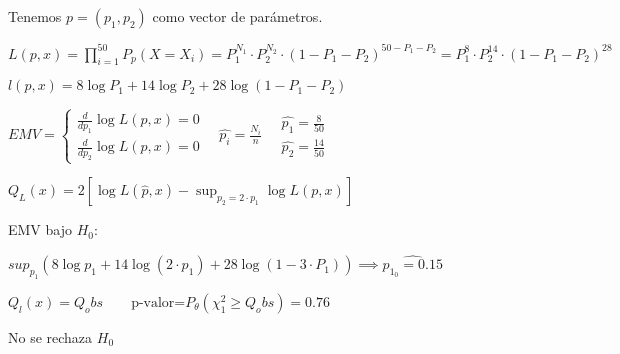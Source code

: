 Tenemos $p=(p_1,p_2)$ como vector de parámetros.

\(
L(p,x)=\prod_{i=1}^{50} P_p(X=X_i)=P_1^{N_1}\cdot P_2^{N_2}\cdot (1-P_1-P_2)^{50-P_1-P_2}=P_1^8\cdot P_2^{14} \cdot (1-P_1-P_2)^{28}
\)

\(
l(p,x)=8 \log P_1 +14 \log P_2 +28 \log (1-P_1-P_2)
\)

\(
EMV=\left\{
\begin{array}{l}
    \frac{d}{d p_1} \log L(p,x)=0\\
    \frac{d}{d p_2} \log L(p,x)=0
\end{array}
\right.
\quad \hat{p_i}=\frac{N_i}{n}
\quad
\begin{matrix}
    \hat{p_1}=\frac{8}{50}\\
    \hat{p_2}=\frac{14}{50}
\end{matrix}
\)

\(
Q_L(x)=2[\log L(\hat{p},x)-\sup_{p_2=2\cdot p_1}\log L(p,x)]
\)


EMV bajo $H_0$:

\(
sup_{p_1}(8 \log p_1 +14 \log(2\cdot p_1)+28 \log(1-3\cdot P_1))\implies \hat{p_{1_0}=0.15}
\)

\(
Q_l(x)=Q_obs \qquad \text{p-valor=}P_\theta(\chi^2_1 \geq Q_obs)=0.76
\)

No se rechaza $H_0$



